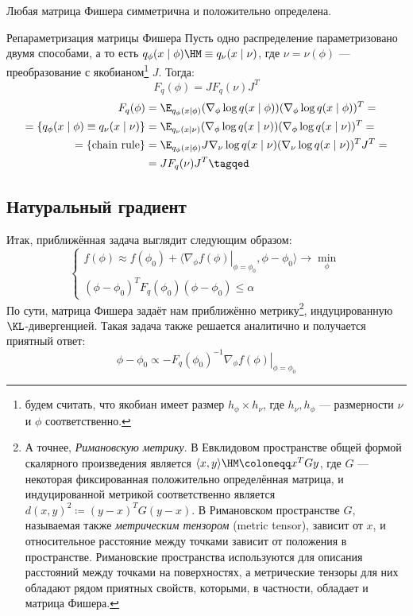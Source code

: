 \begin{proposition}
Любая матрица Фишера симметрична и положительно определена.
\end{proposition}

\begin{theoremBox}{Репараметризация матрицы Фишера}
Пусть одно распределение параметризовано двумя способами, а то есть $q_\phi(x \mid \phi) \HM\equiv q_\nu(x \mid \nu)$, где $\nu = \nu(\phi)$ --- преобразование с якобианом\footnote[*]{будем считать, что якобиан имеет размер $h_\phi \times h_\nu$, где $h_\nu, h_\phi$ --- размерности $\nu$ и $\phi$ соответственно.} $J$. Тогда:
\begin{equation}\label{Fisherreparam}
F_q(\phi) = JF_q(\nu)J^T
\end{equation}
\beginproof
\begin{align*}
F_q(\phi) &= \E_{q_\phi(x \mid \phi)} (\nabla_\phi \log q(x \mid \phi)) (\nabla_\phi \log q(x \mid \phi) )^T = \\
= \{ q_\phi(x \mid \phi) \equiv q_\nu(x \mid \nu) \} 
&= \E_{q_\nu(x \mid \nu)} (\nabla_\phi \log q(x \mid \nu)) (\nabla_\phi \log q(x \mid \nu) )^T = \\
= \{ \text{chain rule} \}
&= \E_{q_\phi(x \mid \phi)} J \nabla_\nu \log q(x \mid \nu) (\nabla_\nu \log q(x \mid \nu) )^T J^T = \\
&= JF_q(\nu)J^T \tagqed
\end{align*}
\end{theoremBox}

\subsection{Натуральный градиент}

Итак, приближённая задача выглядит следующим образом:
$$\begin{cases}
f(\phi) \approx f(\phi_0) + \langle \left. \nabla_\phi f(\phi) \right|_{\phi = \phi_0}, \phi - \phi_0 \rangle \to \min\limits_{\phi} \\
(\phi - \phi_0)^T F_q(\phi_0) (\phi - \phi_0) \le \alpha
\end{cases}$$
По сути, матрица Фишера задаёт нам приближённо метрику\footnote{А точнее, \emph{Римановскую метрику}. В Евклидовом пространстве общей формой скалярного произведения является $\langle x, y \rangle \HM\coloneqq x^TGy$, где $G$ --- некоторая фиксированная положительно определённая матрица, и индуцированной метрикой соответственно является $d(x, y)^2 \coloneqq  (y - x)^T G (y - x)$. В Римановском пространстве $G$, называемая также \emph{метрическим тензором} (metric tensor), зависит от $x$, и относительное расстояние между точками зависит от положения в пространстве. Римановские пространства используются для описания расстояний между точками на поверхностях, а метрические тензоры для них обладают рядом приятных свойств, которыми, в частности, обладает и матрица Фишера.}, индуцированную $\KL$-дивергенцией. Такая задача также решается аналитично и получается приятный ответ:
\begin{equation}\label{naturalgradient}
\phi - \phi_0 \propto -F_q(\phi_0)^{-1} \left. \nabla_\phi f(\phi) \right|_{\phi = \phi_0}
\end{equation}

